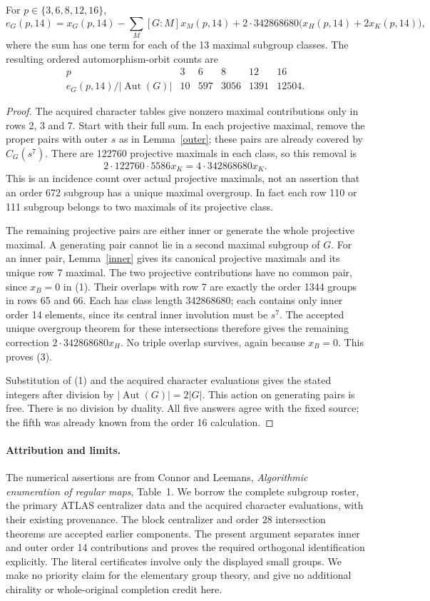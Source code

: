 \documentclass[11pt,a4paper]{article}
\begin{document}
\begin{theorem}
For $p\in\{3,6,8,12,16\}$,
\[
 e_G(p,14)=x_G(p,14)-\sum_{M}[G:M]x_M(p,14)
       +2\cdot342868680\bigl(x_H(p,14)+2x_K(p,14)\bigr),       \tag{3}
\]
where the sum has one term for each of the 13 maximal subgroup
classes. The resulting ordered automorphism-orbit counts are
\[
\begin{array}{c|rrrrr}
p&3&6&8&12&16\\\hline
e_G(p,14)/|\operatorname{Aut}(G)|&10&597&3056&1391&12504.
\end{array}
\]
\end{theorem}
\begin{proof}
The acquired character tables give nonzero maximal contributions
only in rows 2, 3 and 7. Start with their full sum. In each
projective maximal, remove the proper pairs with outer $s$ as in
Lemma~\ref{outer}; these pairs are already covered by $C_G(s^7)$.
There are 122760 projective maximals in each class, so this removal
is
\[
2\cdot122760\cdot5586x_K=4\cdot342868680x_K.
\]
This is an incidence count over actual projective maximals, not
an assertion that an order 672 subgroup has a unique maximal
overgroup. In fact each row 110 or 111 subgroup belongs to two
maximals of its projective class.

The remaining projective pairs are either inner or generate the
whole projective maximal. A generating pair cannot lie in a second
maximal subgroup of $G$. For an inner pair, Lemma~\ref{inner}
gives its canonical projective maximals and its unique row 7
maximal. The two projective contributions have no common pair,
since $x_B=0$ in (1). Their overlaps with row 7 are exactly the
order 1344 groups in rows 65 and 66. Each has class length
342868680; each contains only inner order 14 elements, since its
central inner involution must be $s^7$. The accepted unique
overgroup theorem for these intersections therefore gives the
remaining correction $2\cdot342868680x_H$. No triple overlap
survives, again because $x_B=0$. This proves (3).

Substitution of (1) and the acquired character evaluations gives
the stated integers after division by $|\operatorname{Aut}(G)|=2|G|$.
This action on generating pairs is free. There is no division by
duality. All five answers agree with the fixed source; the fifth
was already known from the order 16 calculation.
\end{proof}

\paragraph{Attribution and limits.}
The numerical assertions are from Connor and Leemans,
\emph{Algorithmic enumeration of regular maps}, Table~1. We borrow
the complete subgroup roster, the primary ATLAS centralizer data
and the acquired character evaluations, with their existing
provenance. The block centralizer and order 28 intersection theorems
are accepted earlier components. The present argument separates
inner and outer order 14 contributions and proves the required
orthogonal identification explicitly. The literal certificates
involve only the displayed small groups. We make no priority claim
for the elementary group theory, and give no additional chirality
or whole-original completion credit here.
\end{document}
